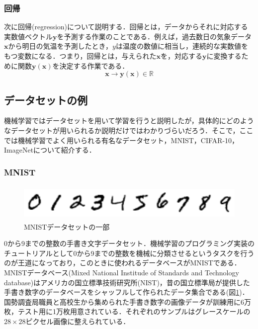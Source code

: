 \documentclass[a4paper,11pt]{jsreport}
\begin{document}
\subsubsection*{回帰}
次に回帰(regression)について説明する．回帰とは，データからそれに対応する実数値ベクトル$\bm{y}$を予測する作業のことである．例えば，過去数日の気象データ$\bm{x}$から明日の気温を予測したとき，$y$は温度の数値に相当し，連続的な実数値をもつ変数になる．つまり，回帰とは，与えられた$\bm{x}$を，対応する$\bm{y}$に変換するために関数$\bm{y}(\bm{x})$を決定する作業である．
\begin{equation}
  \bm{x} \longrightarrow \bm{y}(\bm{x}) \in \mathbb{R}
\end{equation}

\subsection{データセットの例}
機械学習ではデータセットを用いて学習を行うと説明したが，具体的にどのようなデータセットが用いられるか説明だけではわかりづらいだろう．そこで，ここでは機械学習でよく用いられる有名なデータセット，MNIST，CIFAR-10，ImageNetについて紹介する．
\subsubsection*{MNIST}
\begin{figure}[H]
  \begin{center}
      \includegraphics[height=1.8cm]{image/mnist.png}
      \caption{MNISTデータセットの一部}
      \label{MNIST}
  \end{center}
\end{figure}
0から9までの整数の手書き文字データセット．機械学習のプログラミング実装のチュートリアルとして0から9までの整数を機械に分類させるというタスクを行うのが王道になっており，このときに使われるデータベースがMNISTである．MNISTデータベース(Mixed National Institude of Standards and Technology database)はアメリカの国立標準技術研究所(NIST)，昔の国立標準局が提供した手書き数字のデータベースをシャッフルして作られたデータ集合である(図\ref{MNIST})．国勢調査局職員と高校生から集められた手書き数字の画像データが訓練用に6万枚，テスト用に1万枚用意されている．それぞれのサンプルはグレースケールの$28 \times 28$ピクセル画像に整えられている．
\end{document}
